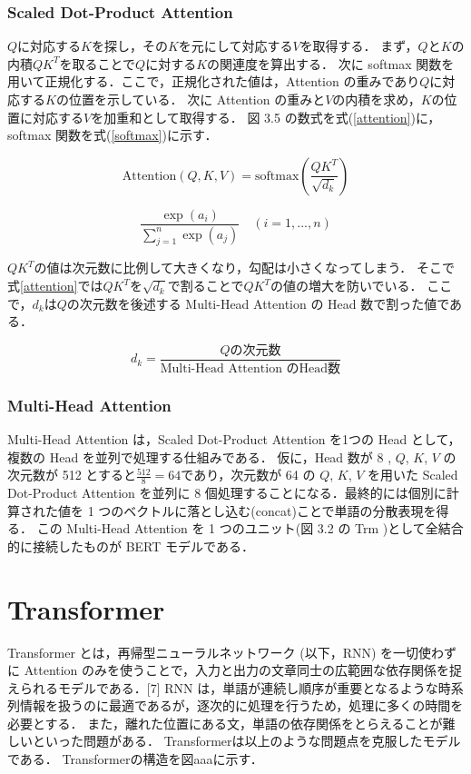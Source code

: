 
\subsubsection{Scaled Dot-Product Attention}
 ${Q}$に対応する${K}$を探し，その${K}$を元にして対応する${V}$を取得する．
まず，${Q}$と${K}$の内積${QK^T}$を取ることで${Q}$に対する${K}$の関連度を算出する．
次に softmax 関数を用いて正規化する．ここで，正規化された値は，Attention の重みであり${Q}$に対応する${K}$の位置を示している．
次に Attention の重みと${V}$の内積を求め，${K}$の位置に対応する${V}$を加重和として取得する．
図 3.5 の数式を式(\ref{attention})に，softmax 関数を式(\ref{softmax})に示す．

\begin{equation}
    \mbox{Attention}(Q,K,V) = \mbox{softmax}\left( \frac{QK^T}{\sqrt{d_k}}\right)
    \label{attention}
\end{equation}

\begin{equation}
    \label{softmax}
    \frac{\exp(a_i)}{\sum_{j=1}^{n}\exp(a_j)} \quad(i=1,...,n)
\end{equation}

${QK^T}$の値は次元数に比例して大きくなり，勾配は小さくなってしまう．
そこで式\ref{attention}では${QK^T}$を${\sqrt{d_k}}$で割ることで${QK^T}$の値の増大を防いでいる．
ここで，${d_k}$は${Q}$の次元数を後述する Multi-Head Attention の Head 数で割った値である．

\begin{equation}
    \label{dk}
    d_k = \frac{Q\mbox{の次元数}}{\mbox{Multi-Head Attention のHead数}}
\end{equation}

\subsubsection{Multi-Head Attention}
Multi-Head Attention は，Scaled Dot-Product Attention を1つの Head として，複数の Head を並列で処理する仕組みである．
仮に，Head 数が 8 , ${Q}$, ${K}$, ${V}$ の次元数が 512 とすると${\frac{512}{8}=64}$であり，次元数が 64 の ${Q}$, ${K}$, ${V}$ を用いた Scaled Dot-Product Attention を並列に 8 個処理することになる．最終的には個別に計算された値を 1 つのベクトルに落とし込む(concat)ことで単語の分散表現を得る．
この Multi-Head Attention を 1 つのユニット(図 3.2 の Trm )として全結合的に接続したものが BERT モデルである．

\section{Transformer \label{c4s4}}
Transformer とは，再帰型ニューラルネットワーク (以下，RNN) を一切使わずに Attention のみを使うことで，入力と出力の文章同士の広範囲な依存関係を捉えられるモデルである．[7]
RNN は，単語が連続し順序が重要となるような時系列情報を扱うのに最適であるが，逐次的に処理を行うため，処理に多くの時間を必要とする．
また，離れた位置にある文，単語の依存関係をとらえることが難しいといった問題がある．
Transformerは以上のような問題点を克服したモデルである．
Transformerの構造を図aaaに示す．

